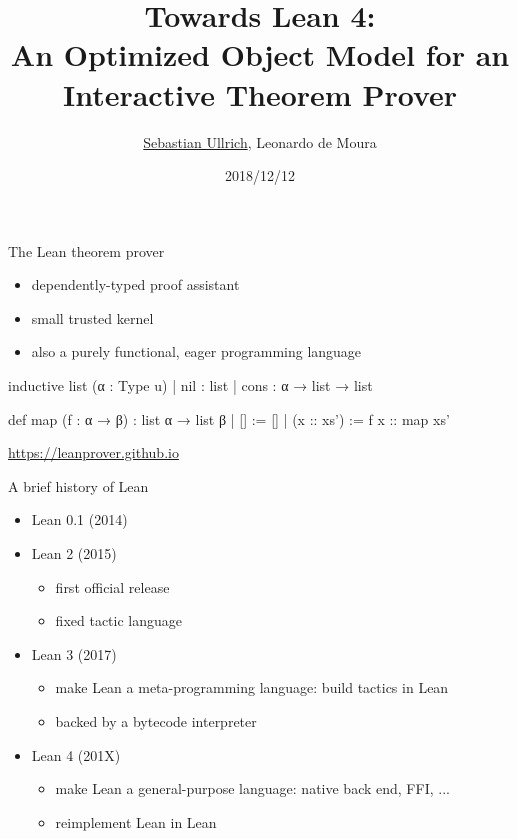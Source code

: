 \documentclass[t]{beamer}
\title{Towards Lean 4:\\ An Optimized Object Model for an Interactive Theorem Prover}
\author[Ullrich, de Moura]{\underline{Sebastian Ullrich}\inst{1}, Leonardo de Moura\inst{2}}
\subtitle{\insertauthor}
\institute[]{\inst{1}Karlsruhe Institute of Technology, Germany\ \ \ \inst{2}Microsoft Research, USA}
\date{2018/12/12}
\newcommand{\kit}[1]{\textcolor{KITgreen}{#1}}
\begin{document}
\begin{frame}
  \maketitle
\end{frame}

\begin{frame}[fragile,t]{The Lean theorem prover}
  \begin{itemize}
  \item dependently-typed proof assistant
  \item small trusted kernel
  \item also a \kit{purely functional, eager programming language}
  \end{itemize}
  
\begin{leancode}
inductive list (α : Type u)
| nil : list
| cons : α → list → list
\end{leancode}
  \vspace{-0.5cm}
\begin{leancode}
def map (f : α → β) : list α → list β
| []         := []
| (x :: xs') := f x :: map xs'
\end{leancode}

  \begin{center}
    \Large\url{https://leanprover.github.io}
  \end{center}
\end{frame}

\begin{frame}{A brief history of Lean}
  \begin{itemize}
  \item Lean 0.1 (2014)
  \item Lean 2 (2015)
    \begin{itemize}
    \item first official release
    \item fixed tactic language
    \end{itemize}
  \item Lean 3 (2017)
    \begin{itemize}
    \item make Lean a \kit{meta-programming} language: build tactics in Lean
    \item backed by a bytecode interpreter
    \end{itemize}
  \item Lean 4 (201X)
    \begin{itemize}
    \item make Lean a \kit{general-purpose} language: native back end, FFI, ...
    \item reimplement Lean in Lean
    \end{itemize}
  \end{itemize}
\end{frame}
\end{document}
